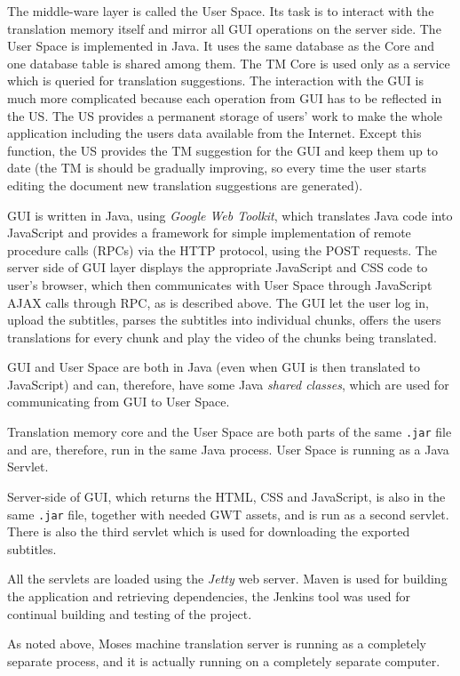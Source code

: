 The middle-ware layer is called the User Space. Its task is to interact with the translation memory itself and mirror all GUI operations on the server side. The User Space is implemented in Java. It uses the same database as the Core and one database table is shared among them. The TM Core is used only as a service which is queried for translation suggestions. The interaction with the GUI is much more complicated because each operation from GUI has to be reflected in the US. The US provides a permanent storage of users' work to make the whole application including the users data available from the Internet. Except this function, the US provides the TM suggestion for the GUI and keep them up to date (the TM is should be gradually improving, so every time the user starts editing the document new translation suggestions are generated).

GUI is written in Java, using \emph{Google Web Toolkit}, which translates Java code into JavaScript and provides a framework for simple implementation of remote procedure calls (RPCs) via the HTTP protocol, using the POST requests. The server side of GUI layer displays the appropriate JavaScript and CSS code to user's browser, which then communicates with User Space through JavaScript AJAX calls through RPC, as is described above. The GUI let the user log in, upload the subtitles, parses the subtitles into individual chunks, offers the users translations for every chunk and play the video of the chunks being translated.

GUI and User Space are both in Java (even when GUI is then translated to JavaScript) and can, therefore, have some Java \emph{shared classes}, which are used for communicating from GUI to User Space.

Translation memory core and the User Space are both parts of the same \texttt{.jar} file and are, therefore, run in the same Java process. User Space is running as a Java Servlet.

Server-side of GUI, which returns the HTML, CSS and JavaScript, is also in the same \texttt{.jar} file, together with needed GWT assets, and is run as a second servlet. There is also the third servlet which is used for downloading the exported subtitles.

All the servlets are loaded using the \emph{Jetty} web server. Maven is used for building the application and retrieving dependencies, the Jenkins tool was used for continual building and testing of the project.

As noted above, Moses machine translation server is running as a completely separate process, and it is actually running on a completely separate computer.

